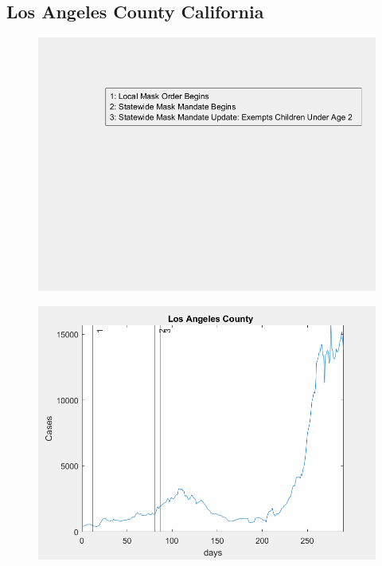 \documentclass[12pt]{article}
\begin{document}
\FloatBarrier

\subsection[Subtitle]{\large Los Angeles County California}

\begin{figure}[!h]
	\includegraphics[width=\linewidth]{legends/los_angeles_mask_order_legend.png}
	\caption{}
	\label{fig:legends/los_angeles_mask_order_legendLabel}
\end{figure}

\begin{figure}[!h]
	\includegraphics[width=\linewidth]{images/los_angeles_mask_order.png}
	\caption{}
	\label{fig:images/los_angeles_mask_orderLabel}
\end{figure}
\end{document}

